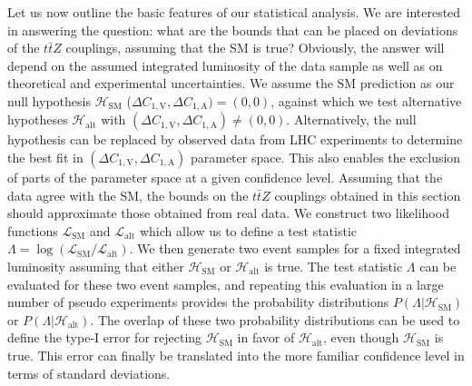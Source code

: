 \documentclass{JHEP3}
\newcommand{\SM}{\mathrm{SM}}
\newcommand{\alt}{\mathrm{alt}}
\def\ttbZ{t\bar{t}Z}
\def\DConeA{\Delta C_{1,\mathrm{A}}}
\def\DConeV{\Delta C_{1,\mathrm{V}}}
\def\Halt{\mathcal{H}_{\mathrm{alt}}}
\begin{document}
Let us now outline the basic features of our statistical analysis.
We are interested in answering the question: what are the bounds that can be placed on deviations of the $\ttbZ$ couplings, assuming that the SM is true?
Obviously, the answer will depend on the assumed integrated luminosity of the data sample as well as on theoretical and experimental uncertainties. 
We assume the SM prediction as our null hypothesis 
$\mathcal{H}_{\mathrm{SM}}$ ($\DConeV,\DConeA)=(0,0)$,
against which we test alternative hypotheses $\Halt$ with $(\DConeV,\DConeA) \ne (0,0)$.
Alternatively, the null hypothesis can be replaced by observed data from LHC experiments to determine the best fit in $(\DConeV,\DConeA)$ parameter space.
This also enables the exclusion of parts of the parameter space at a given confidence level. 
Assuming that the data agree with the SM, 
the bounds on the $\ttbZ$ couplings 
obtained in this section should approximate those obtained from real data. 
We construct two likelihood functions $\mathcal{L}_{\SM}$ and $\mathcal{L}_{\alt}$ which allow us to define a test 
statistic $\Lambda = \log \left( \mathcal{L}_{\SM} / \mathcal{L}_{\alt} \right)$.
We then generate two event samples for a fixed integrated luminosity assuming that either $\mathcal{H}_{\mathrm{SM}}$ or $\Halt$ is true.
The test statistic $\Lambda$ can be evaluated for these two event samples, and 
repeating this evaluation in a large number of pseudo experiments provides the probability distributions $P(\Lambda|\mathcal{H}_{\mathrm{SM}})$ or $P(\Lambda|\Halt)$.
The overlap of these two probability distributions can be used to define the type-I error for rejecting $\mathcal{H}_{\mathrm{SM}}$ in favor of $\Halt$, even though $\mathcal{H}_{\mathrm{SM}}$ is true.
This error can finally be translated into the more familiar confidence level in terms of standard deviations.
\end{document}
